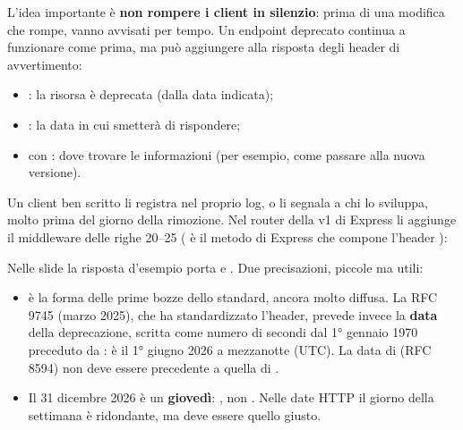 L'idea importante è \textbf{non rompere i client in silenzio}: prima di una
modifica che rompe, vanno avvisati per tempo. Un endpoint deprecato continua a
funzionare come prima, ma può aggiungere alla risposta degli header di
avvertimento:

\begin{itemize}
  \item {}: la risorsa è deprecata (dalla data indicata);
  \item {}: la data in cui smetterà di rispondere;
  \item {} con : dove trovare le informazioni
        (per esempio, come passare alla nuova versione).
\end{itemize}

Un client ben scritto li registra nel proprio log, o li segnala a chi lo
sviluppa, molto prima del giorno della rimozione. Nel router della v1 di
Express li aggiunge il middleware delle righe 20--25 ( è il
metodo di Express che compone l'header ):


Nelle slide la risposta d'esempio porta  e
. Due precisazioni, piccole ma
utili:

\begin{itemize}
  \item {} è la forma delle prime bozze dello standard,
        ancora molto diffusa. La RFC 9745 (marzo 2025), che ha standardizzato
        l'header, prevede invece la \textbf{data} della deprecazione, scritta
        come numero di secondi dal 1° gennaio 1970 preceduto da :
         è il 1° giugno 2026 a mezzanotte (UTC). La data di
         (RFC 8594) non deve essere precedente a quella di
        .
  \item Il 31 dicembre 2026 è un \textbf{giovedì}: , non
        . Nelle date HTTP il giorno della settimana è ridondante, ma
        deve essere quello giusto.
\end{itemize}

